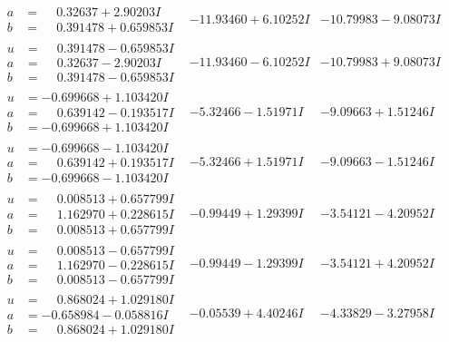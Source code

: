 \documentclass[1p]{elsarticle_modified}
\theoremstyle{definition}
\begin{document}
$$\begin{array}{c|c|c}
\begin{aligned}
a &= \phantom{-}0.32637 + 2.90203 I \\
b &= \phantom{-}0.391478 + 0.659853 I\end{aligned}
 & -11.93460 + 6.10252 I & -10.79983 - 9.08073 I \\ \hline\begin{aligned}
u &= \phantom{-}0.391478 - 0.659853 I \\
a &= \phantom{-}0.32637 - 2.90203 I \\
b &= \phantom{-}0.391478 - 0.659853 I\end{aligned}
 & -11.93460 - 6.10252 I & -10.79983 + 9.08073 I \\ \hline\begin{aligned}
u &= -0.699668 + 1.103420 I \\
a &= \phantom{-}0.639142 - 0.193517 I \\
b &= -0.699668 + 1.103420 I\end{aligned}
 & -5.32466 - 1.51971 I & -9.09663 + 1.51246 I \\ \hline\begin{aligned}
u &= -0.699668 - 1.103420 I \\
a &= \phantom{-}0.639142 + 0.193517 I \\
b &= -0.699668 - 1.103420 I\end{aligned}
 & -5.32466 + 1.51971 I & -9.09663 - 1.51246 I \\ \hline\begin{aligned}
u &= \phantom{-}0.008513 + 0.657799 I \\
a &= \phantom{-}1.162970 + 0.228615 I \\
b &= \phantom{-}0.008513 + 0.657799 I\end{aligned}
 & -0.99449 + 1.29399 I & -3.54121 - 4.20952 I \\ \hline\begin{aligned}
u &= \phantom{-}0.008513 - 0.657799 I \\
a &= \phantom{-}1.162970 - 0.228615 I \\
b &= \phantom{-}0.008513 - 0.657799 I\end{aligned}
 & -0.99449 - 1.29399 I & -3.54121 + 4.20952 I \\ \hline\begin{aligned}
u &= \phantom{-}0.868024 + 1.029180 I \\
a &= -0.658984 - 0.058816 I \\
b &= \phantom{-}0.868024 + 1.029180 I\end{aligned}
 & -0.05539 + 4.40246 I & -4.33829 - 3.27958 I \\ \hline\begin{aligned}

\end{aligned}
\end{array}$$
\end{document}
